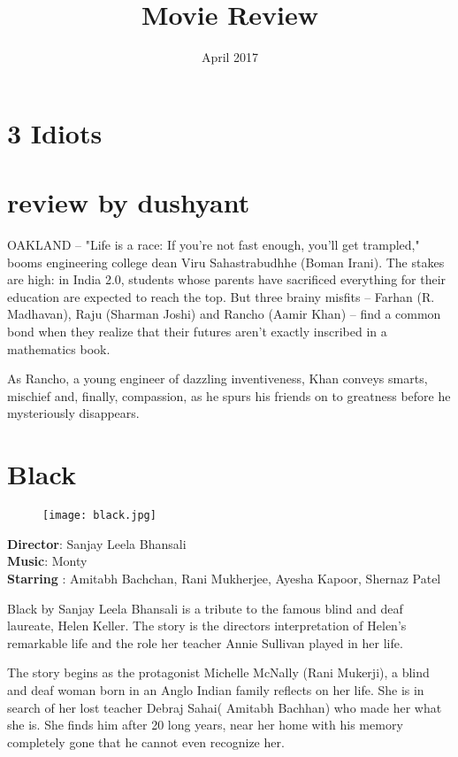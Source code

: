 \documentclass{article}
\title{Movie Review}
\date{April 2017}
\begin{document}
\maketitle

\section{3 Idiots}
\section{review by dushyant}
OAKLAND -- "Life is a race: If you're not fast enough, you'll get trampled," booms engineering college dean Viru Sahastrabudhhe (Boman Irani). The stakes are high: in India 2.0, students whose parents have sacrificed everything for their education are expected to reach the top. But three brainy misfits -- Farhan (R. Madhavan), Raju (Sharman Joshi) and Rancho (Aamir Khan) -- find a common bond when they realize that their futures aren't exactly inscribed in a mathematics book.

As Rancho, a young engineer of dazzling inventiveness, Khan conveys smarts, mischief and, finally, compassion, as he spurs his friends on to greatness before he mysteriously disappears.

\section{Black}
\begin{figure}[h!]
  \texttt{[image: black.jpg]}
\end{figure}
\begin{flushleft}
\textsf{\textbf{Director}: Sanjay Leela Bhansali\\ 
        \textbf{Music}: Monty\\
        \textbf{Starring} : Amitabh Bachchan, Rani Mukherjee, Ayesha Kapoor, Shernaz Patel}\\
\end{flushleft}  
                           
         \vspace{2mm}
Black by Sanjay Leela Bhansali is a tribute to the famous blind and deaf laureate, Helen Keller. The story is the directors interpretation of Helen's remarkable life and the role her teacher Annie Sullivan played in her life.
\par
The story begins as the protagonist Michelle McNally (Rani Mukerji), a blind and deaf woman born in an Anglo Indian family reflects on her life. She is in search of her lost teacher Debraj Sahai( Amitabh Bachhan) who made her what she is. She finds him after 20 long years, near her home with his memory completely gone that he cannot even recognize her.
\end{document}
